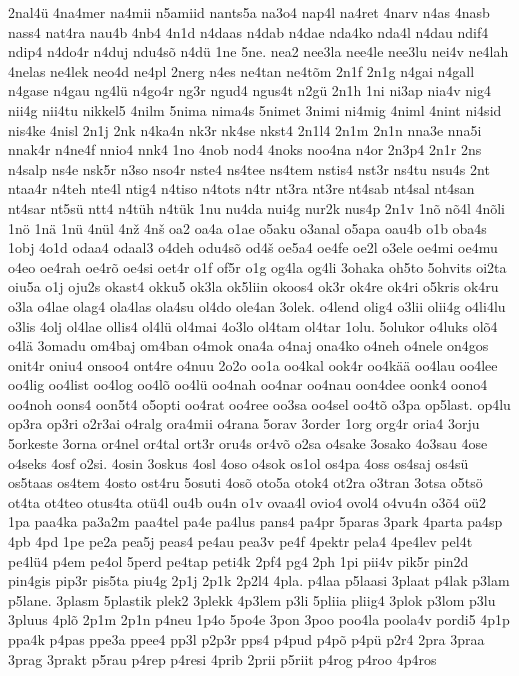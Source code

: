 {2nal4ü
4na4mer
na4mii
n5amiid
nants5a
na3o4
nap4l
na4ret
4narv
n4as
4nasb
nass4
nat4ra
nau4b
4nb4
4n1d
n4daas
n4dab
n4dae
nda4ko
nda4l
n4dau
ndif4
ndip4
n4do4r
n4duj
ndu4sõ
n4dü
1ne
5ne.
nea2
nee3la
nee4le
nee3lu
nei4v
ne4lah
4nelas
ne4lek
neo4d
ne4pl
2nerg
n4es
ne4tan
ne4tõm
2n1f
2n1g
n4gai
n4gall
n4gase
n4gau
ng4lü
n4go4r
ng3r
ngud4
ngus4t
n2gü
2n1h
1ni
ni3ap
nia4v
nig4
nii4g
nii4tu
nikkel5
4nilm
5nima
nima4s
5nimet
3nimi
ni4mig
4niml
4nint
ni4sid
nis4ke
4nisl
2n1j
2nk
n4ka4n
nk3r
nk4se
nkst4
2n1l4
2n1m
2n1n
nna3e
nna5i
nnak4r
n4ne4f
nnio4
nnk4
1no
4nob
nod4
4noks
noo4na
n4or
2n3p4
2n1r
2ns
n4salp
ns4e
nsk5r
n3so
nso4r
nste4
ns4tee
ns4tem
nstis4
nst3r
ns4tu
nsu4s
2nt
ntaa4r
n4teh
nte4l
ntig4
n4tiso
n4tots
n4tr
nt3ra
nt3re
nt4sab
nt4sal
nt4san
nt4sar
nt5sü
ntt4
n4tüh
n4tük
1nu
nu4da
nui4g
nur2k
nus4p
2n1v
1nõ
nõ4l
4nõli
1nö
1nä
1nü
4nül
4nž
4nš
oa2
oa4a
o1ae
o5aku
o3anal
o5apa
oau4b
o1b
oba4s
1obj
4o1d
odaa4
odaal3
o4deh
odu4sõ
od4š
oe5a4
oe4fe
oe2l
o3ele
oe4mi
oe4mu
o4eo
oe4rah
oe4rõ
oe4si
oet4r
o1f
of5r
o1g
og4la
og4li
3ohaka
oh5to
5ohvits
oi2ta
oiu5a
o1j
oju2s
okast4
okku5
ok3la
ok5liin
okoos4
ok3r
ok4re
ok4ri
o5kris
ok4ru
o3la
o4lae
olag4
ola4las
ola4su
ol4do
ole4an
3olek.
o4lend
olig4
o3lii
olii4g
o4li4lu
o3lis
4olj
ol4lae
ollis4
ol4lü
ol4mai
4o3lo
ol4tam
ol4tar
1olu.
5olukor
o4luks
olõ4
o4lä
3omadu
om4baj
om4ban
o4mok
ona4a
o4naj
ona4ko
o4neh
o4nele
on4gos
onit4r
oniu4
onsoo4
ont4re
o4nuu
2o2o
oo1a
oo4kal
ook4r
oo4kää
oo4lau
oo4lee
oo4lig
oo4list
oo4log
oo4lõ
oo4lü
oo4nah
oo4nar
oo4nau
oon4dee
oonk4
oono4
oo4noh
oons4
oon5t4
o5opti
oo4rat
oo4ree
oo3sa
oo4sel
oo4tõ
o3pa
op5last.
op4lu
op3ra
op3ri
o2r3ai
o4ralg
ora4mii
o4rana
5orav
3order
1org
org4r
oria4
3orju
5orkeste
3orna
or4nel
or4tal
ort3r
oru4s
or4võ
o2sa
o4sake
3osako
4o3sau
4ose
o4seks
4osf
o2si.
4osin
3oskus
4osl
4oso
o4sok
os1ol
os4pa
4oss
os4saj
os4sü
os5taas
os4tem
4osto
ost4ru
5osuti
4osõ
oto5a
otok4
ot2ra
o3tran
3otsa
o5tsö
ot4ta
ot4teo
otus4ta
otü4l
ou4b
ou4n
o1v
ovaa4l
ovio4
ovol4
o4vu4n
o3õ4
oü2
1pa
paa4ka
pa3a2m
paa4tel
pa4e
pa4lus
pans4
pa4pr
5paras
3park
4parta
pa4sp
4pb
4pd
1pe
pe2a
pea5j
peas4
pe4au
pea3v
pe4f
4pektr
pela4
4pe4lev
pel4t
pe4lü4
p4em
pe4ol
5perd
pe4tap
peti4k
2pf4
pg4
2ph
1pi
pii4v
pik5r
pin2d
pin4gis
pip3r
pis5ta
piu4g
2p1j
2p1k
2p2l4
4pla.
p4laa
p5laasi
3plaat
p4lak
p3lam
p5lane.
3plasm
5plastik
plek2
3plekk
4p3lem
p3li
5pliia
pliig4
3plok
p3lom
p3lu
3pluus
4plõ
2p1m
2p1n
p4neu
1p4o
5po4e
3pon
3poo
poo4la
poola4v
pordi5
4p1p
ppa4k
p4pas
ppe3a
ppee4
pp3l
p2p3r
pps4
p4pud
p4põ
p4pü
p2r4
2pra
3praa
3prag
3prakt
p5rau
p4rep
p4resi
4prib
2prii
p5riit
p4rog
p4roo
4p4ros
}
